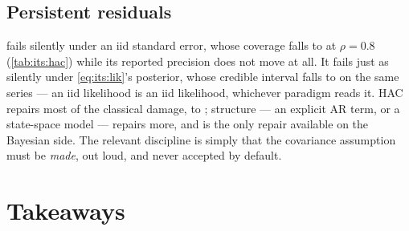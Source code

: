 \subsection*{Persistent residuals}

 fails silently under an iid standard error, whose coverage falls to
\pc{\nbTenArCovIidEight} at $\rho = 0.8$ (\cref{tab:its:hac}) while its reported precision does not
move at all. It fails just as silently under \cref{eq:its:lik}'s posterior, whose credible interval
falls to \pc{\nbTenArCovBayesEight} on the same series --- an iid likelihood is an iid likelihood,
whichever paradigm reads it. HAC repairs most of the classical damage, to \pc{\nbTenArCovHacEight};
structure --- an explicit AR term, or a state-space model --- repairs more, and is the only repair
available on the Bayesian side. The relevant discipline is simply that the covariance assumption
must be \emph{made}, out loud, and never accepted by default.

\section{Takeaways}
\label{sec:its:take}

